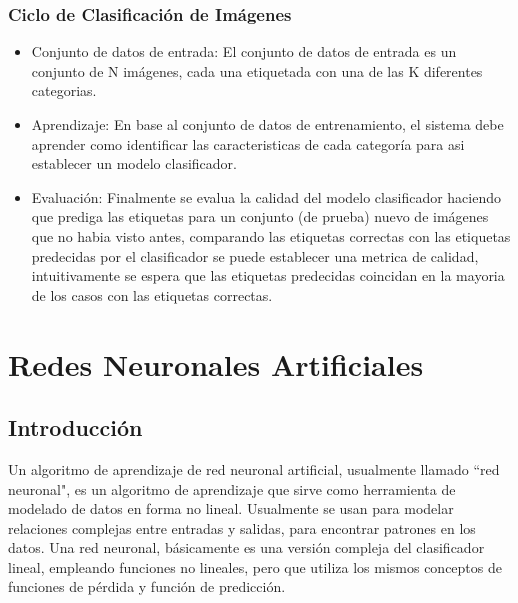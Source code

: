 \documentclass[a4paper,11pt,spanish]{book}
\begin{document}
	\subsubsection {Ciclo de Clasificación de Imágenes}
	  \begin{itemize}
	    \item Conjunto de datos de entrada: El conjunto de datos de entrada es un conjunto de N imágenes, cada una etiquetada con una de las K diferentes categorias.
	    \item Aprendizaje: En base al conjunto de datos de entrenamiento, el sistema debe aprender como identificar las caracteristicas de cada categoría para asi establecer un modelo clasificador.
	    \item Evaluación: Finalmente se evalua la calidad del modelo clasificador haciendo que prediga las etiquetas para un conjunto (de prueba) nuevo de imágenes que no habia visto antes, comparando las
	    etiquetas correctas con las etiquetas predecidas por el clasificador se puede establecer una metrica de calidad, intuitivamente se espera que las etiquetas predecidas coincidan en la mayoria
	    de los casos con las etiquetas correctas.
	  \end{itemize}
\fi


    \section{Redes Neuronales Artificiales}\label{sec:redes_neuronales}

      \subsection{Introducción}
	Un algoritmo de aprendizaje de red neuronal artificial, usualmente llamado ``red neuronal", es un algoritmo de aprendizaje que sirve como herramienta de modelado de datos
	en forma no lineal. 
	Usualmente se usan para modelar relaciones complejas entre entradas y salidas, para encontrar patrones en los datos.
	Una red neuronal, básicamente es una versión compleja del clasificador lineal, empleando funciones no lineales, 
	pero que utiliza los mismos conceptos de funciones de pérdida y función de predicción.
	  
\end{document}
